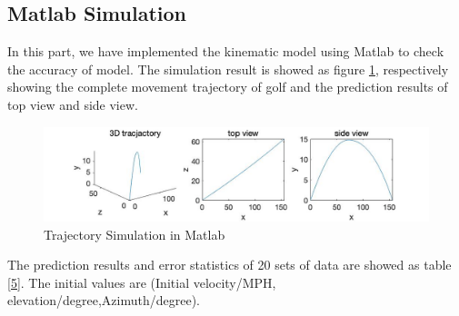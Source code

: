 \subsection{Matlab Simulation}
In this part, we have implemented the kinematic model using Matlab to check  the accuracy of model. The simulation result is showed as figure \ref{fig:matlab}, respectively showing the complete movement trajectory of golf and the prediction results of top view and side view.
\begin{figure}[H]
    \centering
    \includegraphics[width=\textwidth]{figure/Matlab.jpg}
    \caption{Trajectory Simulation in Matlab}
    \label{fig:matlab}
\end{figure}
The prediction results and error statistics of 20 sets of data are showed as table \ref{5}. The initial values are (Initial velocity/MPH, elevation/degree,Azimuth/degree).
